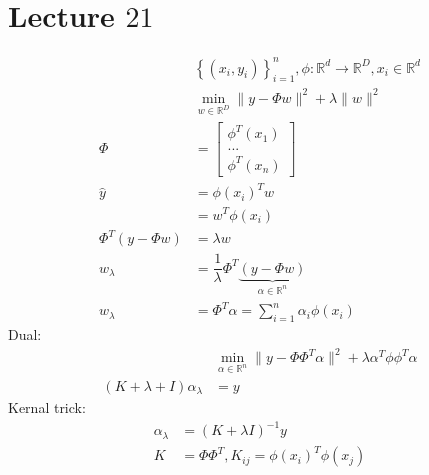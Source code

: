 \documentclass{article}
\begin{document}
\section{Lecture $21$} 
\begin{align*}
&\left\{\left(x_{i}, y_{i}\right)\right\}_{i=1}^{n} , \phi : \mathbb{R}^{d} \to  \mathbb{R}^{D}, x_{i} \in \mathbb{R}^{d}
\\ &\displaystyle\min_{w \in \mathbb{R}^{D}} \| y - \Phi w \|^{2} + \lambda \| w \|^{2}
\\ \Phi &= \begin{bmatrix} \phi^{T}\left(x_{1}\right) \\ ... \\ \phi^{T}\left(x_{n}\right) \end{bmatrix}
\\ \hat{y} &= \phi\left(x_{i}\right)^{T} w 
\\ &= w^{T} \phi\left(x_{i}\right)
\\ \Phi^{T} \left(y - \Phi w\right) &= \lambda w 
\\ w_{\lambda} &= \dfrac{1}{\lambda} \Phi^{T} \underbrace{\left(y - \Phi w\right)}_{\alpha \in \mathbb{R}^{n}}
\\ w_{\lambda} &= \Phi^{T} \alpha = \displaystyle\sum_{i=1}^{n} \alpha_{i} \phi\left(x_{i}\right)
\end{align*}
Dual:
\begin{align*}
&\displaystyle\min_{\alpha \in \mathbb{R}^{n}} \| y - \Phi \Phi^{T} \alpha \|^{2} + \lambda \alpha^{T} \phi \phi^{T} \alpha
\\ \left(K  + \lambda + I\right) \alpha_{\lambda} &= y 
\end{align*}
Kernal trick:
\begin{align*}
\alpha_{\lambda} &= \left(K + \lambda I\right)^{-1} y 
\\ K  &= \Phi \Phi^{T}, K_{ij} = \phi\left(x_{i}\right)^{T} \phi\left(x_{j}\right)
\end{align*}
\end{document}
